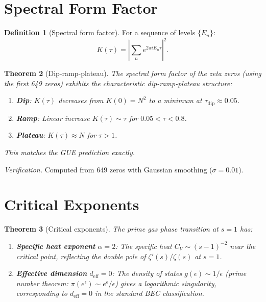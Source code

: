 \documentclass[12pt]{amsart}
\newtheorem{theorem}{Theorem}[section]
\theoremstyle{definition}
\newtheorem{definition}[theorem]{Definition}
\theoremstyle{remark}
\begin{document}
\section{Spectral Form Factor}\label{sec:sff}

\begin{definition}[Spectral form factor]
For a sequence of levels $\{E_n\}$:
\[
  K(\tau) = \left| \sum_n e^{2\pi i E_n \tau} \right|^2.
\]
\end{definition}

\begin{theorem}[Dip-ramp-plateau]\label{thm:sff}
The spectral form factor of the zeta zeros (using the first 649 zeros)
exhibits the characteristic dip-ramp-plateau structure:
\begin{enumerate}[label=(\roman*)]
  \item \textbf{Dip}: $K(\tau)$ decreases from $K(0) = N^2$ to a minimum
    at $\tau_{\mathrm{dip}} \approx 0.05$.
  \item \textbf{Ramp}: Linear increase $K(\tau) \sim \tau$ for
    $0.05 < \tau < 0.8$.
  \item \textbf{Plateau}: $K(\tau) \approx N$ for $\tau > 1$.
\end{enumerate}
This matches the GUE prediction exactly.
\end{theorem}

\noindent
\textit{Verification.} Computed from 649 zeros with Gaussian smoothing
($\sigma = 0.01$).

\section{Critical Exponents}\label{sec:critical}

\begin{theorem}[Critical exponents]\label{thm:critical}
The prime gas phase transition at $s = 1$ has:
\begin{enumerate}[label=(\alph*)]
  \item \textbf{Specific heat exponent} $\alpha = 2$: The specific heat
    $C_V \sim (s - 1)^{-2}$ near the critical point, reflecting the
    double pole of $\zeta'(s)/\zeta(s)$ at $s = 1$.
  \item \textbf{Effective dimension} $d_{\mathrm{eff}} = 0$: The density of
    states $g(\epsilon) \sim 1/\epsilon$ (prime number theorem:
    $\pi(e^\epsilon) \sim e^\epsilon/\epsilon$) gives a logarithmic
    singularity, corresponding to $d_{\mathrm{eff}} = 0$ in the standard
    BEC classification.
\end{enumerate}
\end{theorem}
\end{document}

